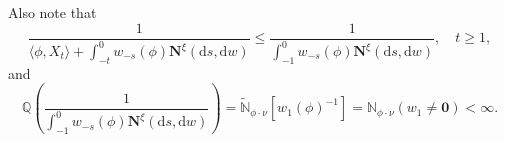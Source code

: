\documentclass[12pt,a4paper]{amsart}
\numberwithin{equation}{section}
\theoremstyle{plain}
\theoremstyle{definition}
\theoremstyle{remark}
\begin{document}
\begin{comment}
\subsection{Proof of Theorem \ref{thm:E}}
\begin{proof}
According to Lemma \ref{lem:extinc}, we only need to prove our result  
when the initial measure is $\nu$.
 It is easy to see that for any $t\ge 0,$
\begin{equation}%
 	e^{-\lambda t}\mathbb P_\nu(\zeta>t)\overset{\eqref{eq:M.3}}= \nu(\phi)\widetilde{\mathbb P}_\nu\left(\frac{1}{\langle\phi, X_{t}\rangle }\right)
=\mathbb Q\left[\frac{1}{\langle\phi, X_{t}\rangle +\int^0_{-t}w_{-s}(\phi)\mathbf N^\xi({\mathrm d}s, {\mathrm d}w)}\right],
\end{equation}
where $\widetilde {\mathbb P}_\nu$ is defined in \eqref{eq:M.3}.
		
Note that $\lim_{t\to\infty}\langle\phi, X_{t}\rangle=0$, $\mathbb Q$-a.s., and
$$
\int^0_{-t}w_{-s}(\phi)\mathbf N^\xi({\mathrm d}s, {\mathrm d}w)\uparrow
\int^0_{-\infty}w_{-s}(\phi)\mathbf N^\xi({\mathrm d}s, {\mathrm d}w)
\quad \mbox{as } t\uparrow\infty.
$$
\end{comment}
Also note that
 \begin{equation}\label{domi-Zt1}
\frac{1}{\langle\phi, X_t\rangle + \int^0_{-t}w_{-s}(\phi)\mathbf N^\xi({\mathrm d}s, {\mathrm d}w)}\leq \frac{1}{\int^0_{-1}w_{-s}(\phi)\mathbf N^\xi({\mathrm d}s, {\mathrm d}w)},\quad t\geq 1,
 \end{equation}
and
\begin{equation}%
\mathbb Q\left(\frac{1}{\int^0_{-1}w_{-s}(\phi)\mathbf N^\xi({\mathrm d}s, {\mathrm d}w)}\right)= \widetilde {\mathbb N}_{\phi\cdot\nu} [w_1(\phi)^{-1}]
= \mathbb N_{\phi\cdot\nu} (w_1\neq \mathbf 0) < \infty.
    \end{equation}
\end{document}
